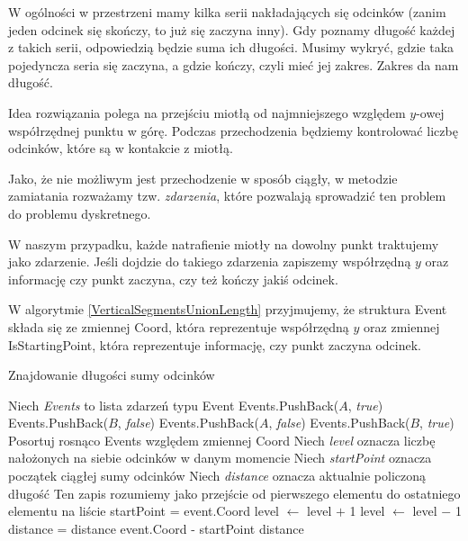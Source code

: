 W ogólności w przestrzeni mamy kilka serii
nakładających się odcinków (zanim jeden odcinek się skończy, to już się zaczyna inny). Gdy poznamy długość każdej
z takich serii, odpowiedzią będzie suma ich długości. Musimy wykryć, gdzie taka pojedyncza seria się zaczyna, a gdzie
kończy, czyli mieć jej zakres. Zakres da nam długość.

Idea rozwiązania polega na przejściu miotłą od najmniejszego względem 
$y$-owej współrzędnej punktu w górę. Podczas przechodzenia
będziemy kontrolować liczbę odcinków, które są w kontakcie z miotłą.

Jako, że nie możliwym jest przechodzenie w sposób ciągły, w
metodzie zamiatania rozważamy tzw. \textit{zdarzenia}, które pozwalają
sprowadzić ten problem do problemu dyskretnego.

W naszym przypadku, każde natrafienie miotły na dowolny punkt
traktujemy jako zdarzenie. Jeśli dojdzie do takiego zdarzenia
zapiszemy współrzędną $y$ oraz informację czy punkt zaczyna, czy też
kończy jakiś odcinek.

W algorytmie \ref{VerticalSegmentsUnionLength} przyjmujemy, że
struktura Event składa się ze zmiennej Coord, która reprezentuje
współrzędną $y$ oraz zmiennej IsStartingPoint, która 
reprezentuje informację, czy punkt zaczyna odcinek.

\begin{algorithm}[H]
	\caption{Znajdowanie długości sumy odcinków}
	\begin{algorithmic}[1]
		\State Niech \textit{Events} to lista zdarzeń typu Event
				\State Events.PushBack($A$, \textit{true})
				\State Events.PushBack($B$, \textit{false})
			\Else
				\State Events.PushBack($A$, \textit{false})
				\State Events.PushBack($B$, \textit{true})
			\EndIf
		\EndFor
		\State Posortuj rosnąco Events względem zmiennej Coord
		\State Niech \textit{level} oznacza liczbę nałożonych na siebie odcinków w danym momencie
		\State Niech \textit{startPoint} oznacza początek ciągłej sumy odcinków
		\State Niech \textit{distance} oznacza aktualnie policzoną długość
		 \Comment Ten zapis rozumiemy jako przejście od pierwszego elementu do ostatniego elementu na liście
					\State startPoint = event.Coord
				\EndIf
				\State level $\gets$ level $+$ 1
			\Else 
				\State level $\gets$ level $-$ 1
					\State distance = distance event.Coord - startPoint
				\EndIf
			\EndIf
		\EndFor
		\State \Return distance
		\EndProcedure
	\end{algorithmic}
	\label{VerticalSegmentsUnionLength}
\end{algorithm}

